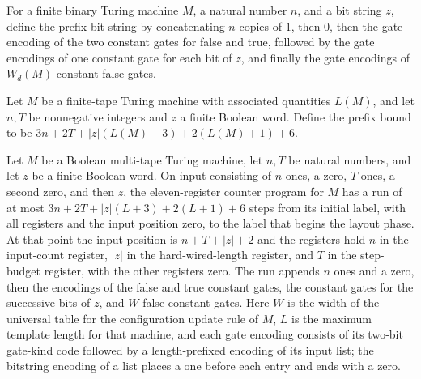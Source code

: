 \begin{definition}
\label{Complexity.UTab.prefixBits}
\leanok
{}
For a finite binary Turing machine $M$, a natural number $n$, and a bit string $z$,
define the prefix bit string by concatenating $n$ copies of $1$, then $0$, then the gate
encoding of the two constant gates for false and true, followed by the gate encodings of
one constant gate for each bit of $z$, and finally the gate encodings of $W_d(M)$
constant-false gates.
\end{definition}

\begin{definition}
\label{Complexity.UTab.prefixBound}
\leanok
{}
Let $M$ be a finite-tape Turing machine with associated quantities $L(M)$, and let $n,T$
be nonnegative integers and $z$ a finite Boolean word. Define the prefix bound to be
$3n+2T+|z|(L(M)+3)+2(L(M)+1)+6$.
\end{definition}

\begin{theorem}
\label{Complexity.UTab.goes_prefix}
\leanok
{}
Let $M$ be a Boolean multi-tape Turing machine, let $n,T$ be natural numbers, and let
$z$ be a finite Boolean word. On input consisting of $n$ ones, a zero, $T$ ones, a
second zero, and then $z$, the eleven-register counter program for $M$ has a run of at
most $3n+2T+|z|(L+3)+2(L+1)+6$ steps from its initial label, with all registers and the
input position zero, to the label that begins the layout phase. At that point the input
position is $n+T+|z|+2$ and the registers hold $n$ in the input-count register, $|z|$ in
the hard-wired-length register, and $T$ in the step-budget register, with the other
registers zero. The run appends $n$ ones and a zero, then the encodings of the false and
true constant gates, the constant gates for the successive bits of $z$, and $W$ false
constant gates. Here $W$ is the width of the universal table for the configuration
update rule of $M$, $L$ is the maximum template length for that machine, and each gate
encoding consists of its two-bit gate-kind code followed by a length-prefixed encoding
of its input list; the bitstring encoding of a list places a one before each entry and
ends with a zero.
\end{theorem}

